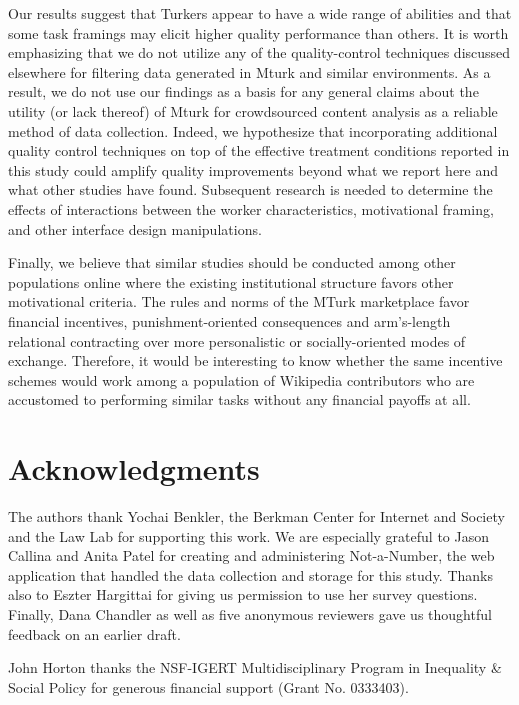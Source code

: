 \documentclass{cscw2010}
\begin{document}
Our results suggest that Turkers appear to have a wide range of
abilities and that some task framings may elicit higher quality
performance than others. It is worth emphasizing that we do not
utilize any of the quality-control techniques discussed elsewhere for
filtering data generated in Mturk and similar
environments\cite{von2004labeling, ipeirotis2010, snow2008cheap,
  Hopkins-King2010, downs2010your, chandler2010, kapelnerpreventing}.
As a result, we do not use our findings as a basis for any general
claims about the utility (or lack thereof) of Mturk for crowdsourced
content analysis as a reliable method of data collection. Indeed, we
hypothesize that incorporating additional quality control techniques
on top of the effective treatment conditions reported in this study
could amplify quality improvements beyond what we report here and what
other studies have found. Subsequent research is needed to determine
the effects of interactions between the worker characteristics,
motivational framing, and other interface design manipulations.

Finally, we believe that similar studies should be conducted among
other populations online where the existing institutional structure
favors other motivational criteria. The rules and norms of the MTurk
marketplace favor financial incentives, punishment-oriented
consequences and arm's-length relational contracting over more
personalistic or socially-oriented modes of exchange. Therefore, it
would be interesting to know whether the same incentive schemes would
work among a population of Wikipedia contributors who are accustomed
to performing similar tasks without any financial payoffs at all.

\section{Acknowledgments}

The authors thank Yochai Benkler, the Berkman Center for Internet and
Society and the Law Lab for supporting this work. We are especially
grateful to Jason Callina and Anita Patel for creating and administering
Not-a-Number, the web application that handled the data collection and
storage for this study. Thanks also to Eszter Hargittai for giving us
permission to use her survey questions. Finally, Dana Chandler as well
as five anonymous reviewers gave us thoughtful feedback on an earlier
draft.

John Horton thanks the NSF-IGERT Multidisciplinary Program in
Inequality \& Social Policy for generous financial support (Grant
No. 0333403).
\end{document}
